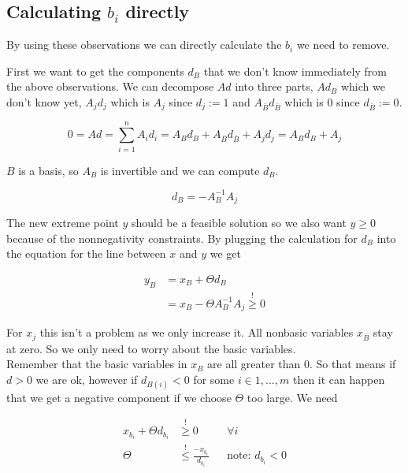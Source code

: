 \subsection{Calculating $b_i$ directly}
By using these observations we can directly calculate the $b_i$ we need to remove.

First we want to get the components $d_B$ that we don't know immediately from the above observations. We can decompose $Ad$ into three parts, $Ad_B$ which we don't know yet, $A_j d_j$ which is $A_j$ since $d_j:=1$ and $A_{\bar B} d_{\bar B}$ which is 0 since $d_{\bar B}:=0$.

\[0= Ad = \sum_{i=1}^{n}A_i d_i  = A_Bd_B + A_{\bar B}d_{\bar B} +  A_jd_j = A_B d_B + A_j\]

$B$ is a basis, so $A_B$ is invertible and we can compute $d_B$.

\begin{equation}
d_B = -A^{-1}_B A_j \label{equ:valueDb}
\end{equation}

The new extreme point $y$ should be a feasible solution so we also want $y\geq 0$ because of the nonnegativity constraints. By plugging the calculation for $d_B$ into the equation for the line between $x$ and $y$ we get

\begin{align*}
y_B &= x_B + \Theta d_B\\
 &= x_B - \Theta A_B^{-1} A_j \stackrel{!}{\geq} 0
\end{align*}

For $x_j$ this isn't a problem as we only increase it. All nonbasic variables $x_{\bar B}$ stay at zero. So we only need to worry about the basic variables. \\ 
Remember that the basic variables in $x_B$ are all greater than 0. 
So that means if $d>0$ we are ok, however if $d_{B(i)} <0$ for some $i \in {1,...,m}$ then it can happen that we get a negative component if we choose $\Theta$ too large. We need 

\begin{center}
\begin{align*}
x_{b_i} +\Theta d_{b_i} & \stackrel{!}{\geq} 0 &&\forall i \\%
\Theta &\stackrel{!}{\leq} \frac{-x_{b_i}}{d_{b_i}} && \text{note: }d_{b_i}<0
\end{align*}
\end{center}


